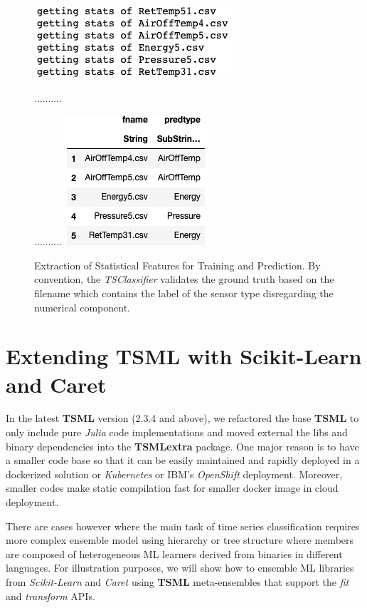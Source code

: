 \documentclass{juliacon}
\begin{document}
\begin{figure}[htbp]
   \centering
   \includegraphics[width=0.5\columnwidth]{tscl1.png} %
   
   ..........
   
   ..........
   \vskip 2pt
   \includegraphics[width=0.4\columnwidth]{tscl2.png} %
   \caption{Extraction of Statistical Features for Training and Prediction. By convention, the \emph{TSClassifier} validates the ground truth based on the filename which contains the label of the sensor type disregarding the numerical component.}
   \label{fig:tcl}
\end{figure}

\section{Extending TSML with Scikit-Learn and Caret}
In the latest \textbf{TSML} version (2.3.4 and above), 
we refactored the base \textbf{TSML}
to only include pure \emph{Julia} code implementations and moved
external the libs and binary dependencies into the \textbf{TSMLextra} package. 
One major reason is to have a smaller code base so that it can be easily
maintained and rapidly deployed in a dockerized solution or 
\emph{Kubernetes} or IBM's \emph{OpenShift} deployment. Moreover, smaller codes make
static compilation fast for smaller docker image  
in cloud deployment. 

\vskip 6pt

There are cases however where the main task of time series classification 
requires more complex ensemble model using hierarchy or tree structure where 
members are composed of heterogeneous ML learners derived from binaries in 
different languages. For illustration purposes, we will show how to 
ensemble ML libraries from \emph{Scikit-Learn} and \emph{Caret} using \textbf{TSML} meta-ensembles that support the  \emph{fit} and \emph{transform} APIs.
\end{document}
